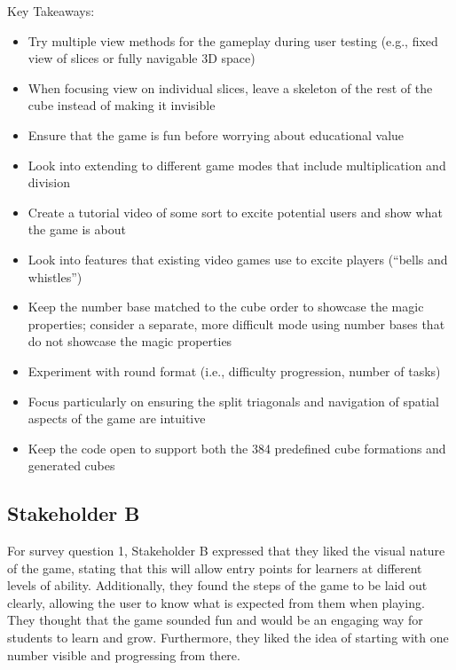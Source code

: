 \documentclass{article}
\begin{document}
Key Takeaways:

\begin{itemize}
    \item Try multiple view methods for the gameplay during user testing (e.g., fixed view of slices or fully navigable 3D space)
    \item When focusing view on individual slices, leave a skeleton of the rest of the cube instead of making it invisible
    \item Ensure that the game is fun before worrying about educational value
    \item Look into extending to different game modes that include multiplication and division
    \item Create a tutorial video of some sort to excite potential users and show what the game is about
    \item Look into features that existing video games use to excite players (``bells and whistles'')
    \item Keep the number base matched to the cube order to showcase the magic properties; consider a separate, more difficult mode using number bases that do not showcase the magic properties
    \item Experiment with round format (i.e., difficulty progression, number of tasks)
    \item Focus particularly on ensuring the split triagonals and navigation of spatial aspects of the game are intuitive
    \item Keep the code open to support both the 384 predefined cube formations and generated cubes
\end{itemize}

\subsection{Stakeholder B}

For survey question 1, Stakeholder B expressed that they liked the visual nature of the game, stating that this will allow entry points for learners at different levels of ability. Additionally, they found the steps of the game to be laid out clearly, allowing the user to know what is expected from them when playing. They thought that the game sounded fun and would be an engaging way for students to learn and grow. Furthermore, they liked the idea of starting with one number visible and progressing from there.
\end{document}
